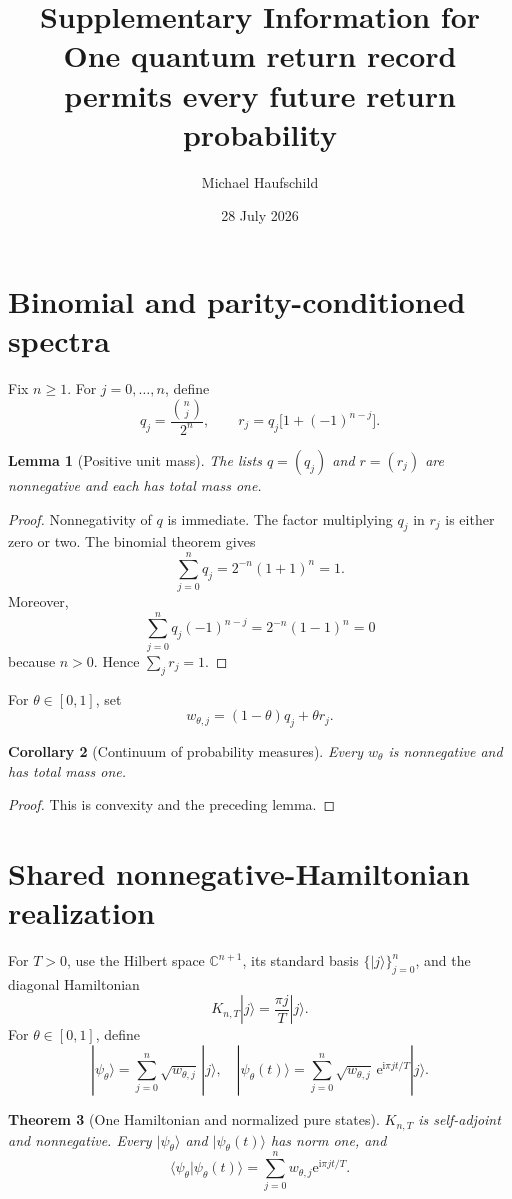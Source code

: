 \documentclass[12pt]{article}
\title{\bfseries Supplementary Information for\\
One quantum return record permits every future return probability}
\author{Michael Haufschild}
\date{28 July 2026}
\newtheorem{theorem}{Theorem}[section]
\newtheorem{lemma}[theorem]{Lemma}
\newtheorem{corollary}[theorem]{Corollary}
\newcommand{\C}{\mathbb C}
\newcommand{\ee}{\mathrm e}
\newcommand{\ii}{\mathrm i}
\begin{document}
\maketitle

\section{Binomial and parity-conditioned spectra}

Fix \(n\geq1\). For \(j=0,\ldots,n\), define
\[
 q_j=\frac{{n\choose j}}{2^n},\qquad
 r_j=q_j\bigl[1+(-1)^{n-j}\bigr].
\]

\begin{lemma}[Positive unit mass]
The lists \(q=(q_j)\) and \(r=(r_j)\) are nonnegative and each has total
mass one.
\end{lemma}

\begin{proof}
Nonnegativity of \(q\) is immediate. The factor multiplying \(q_j\) in
\(r_j\) is either zero or two. The binomial theorem gives
\[
\sum_{j=0}^{n}q_j=2^{-n}(1+1)^n=1.
\]
Moreover,
\[
\sum_{j=0}^{n}q_j(-1)^{n-j}
=2^{-n}(1-1)^n=0
\]
because \(n>0\). Hence \(\sum_jr_j=1\).
\end{proof}

For \(\theta\in[0,1]\), set
\[
 w_{\theta,j}=(1-\theta)q_j+\theta r_j.
\]

\begin{corollary}[Continuum of probability measures]
Every \(w_\theta\) is nonnegative and has total mass one.
\end{corollary}

\begin{proof}
This is convexity and the preceding lemma.
\end{proof}

\section{Shared nonnegative-Hamiltonian realization}

For \(T>0\), use the Hilbert space \(\C^{n+1}\), its standard basis
\(\{|j\rangle\}_{j=0}^{n}\), and the diagonal Hamiltonian
\[
 K_{n,T}|j\rangle=\frac{\pi j}{T}|j\rangle.
\]
For \(\theta\in[0,1]\), define
\[
 |\psi_\theta\rangle
 =\sum_{j=0}^{n}\sqrt{w_{\theta,j}}\,|j\rangle,
\quad
 |\psi_\theta(t)\rangle
 =\sum_{j=0}^{n}\sqrt{w_{\theta,j}}\,
   \ee^{\ii\pi jt/T}|j\rangle.
\]

\begin{theorem}[One Hamiltonian and normalized pure states]
\(K_{n,T}\) is self-adjoint and nonnegative. Every
\(|\psi_\theta\rangle\) and \(|\psi_\theta(t)\rangle\) has norm one, and
\[
\langle\psi_\theta|\psi_\theta(t)\rangle
=\sum_{j=0}^{n}w_{\theta,j}\ee^{\ii\pi jt/T}.
\]
\end{theorem}
\end{document}
